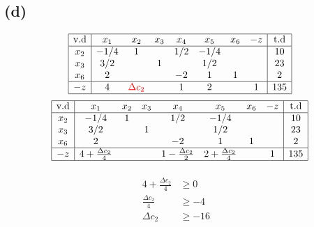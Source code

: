 \documentclass{article}
\begin{document}
\subsection*{(d)}
\begin{spacing}{2}
\begin{equation*}
      \begin{array}{|c|ccccccc|c|}
         \hline
         \text{v.d} & x_1 & x_2 & x_3 & x_4 & x_5 & x_6 & -z & \text{t.d} \\ \hline
       x_2&  -1/4  &  1  &     &  1/2  &  -1/4  &   &   & 10 \\
       x_3&  3/2   &     &  1  &      &   1/2  &   &   & 23\\  
       x_6&  2     &     &     &  -2   &  1     & 1 &   & 2 \\ \hline 
       -z & 4    & \textcolor{red}{\Delta c_2} &    &  1   &  2     &  & 1 & 135 \\ \hline
      \end{array}
      \end{equation*}
\begin{equation*}
      \begin{array}{|c|ccccccc|c|}
         \hline
         \text{v.d} & x_1 & x_2 & x_3 & x_4 & x_5 & x_6 & -z & \text{t.d} \\ \hline
       x_2&  -1/4  &  1  &     &  1/2  &  -1/4  &   &   & 10 \\
       x_3&  3/2   &     &  1  &      &   1/2  &   &   & 23\\  
       x_6&  2     &     &     &  -2   &  1     & 1 &   & 2 \\ \hline 
       -z & 4 + \frac{\Delta c_2}{4}    &  &    &  1-\frac{\Delta c_2}{2}    &  2 + \frac{\Delta c_2}{4}      &  & 1 & 135 \\ \hline
      \end{array}
      \end{equation*}      
\begin{center}
   \begin{align*}
      \begin{matrix}
      \begin{aligned}
      4 + \frac{\Delta c_2}{4} & \geq 0   \\
       \frac{\Delta c_2}{4} & \geq -4   \\
		\Delta c_2 & \geq -16   \\                 
      \end{aligned}
                                              &                                           

\end{matrix}
\end{align*}
\end{center}
\end{spacing}
\end{document}

